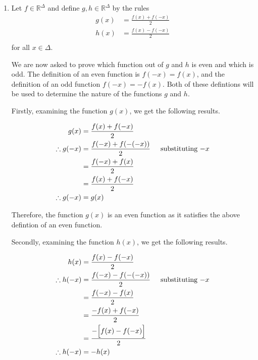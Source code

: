 \documentclass[a4paper]{article}
\begin{document}
\begin{enumerate}[label=\textbf{\arabic*.}]
	\item Let $\displaystyle{f \in \mathbb{R}^{\Delta}}$ and define $\displaystyle{g,h \in \mathbb{R}^{\Delta}}$ by the rules
	\begin{align*}
	g(x) & = \frac{f(x) + f(-x)}{2}\\
	h(x) & = \frac{f(x) - f(-x)}{2}\\
	\end{align*}
	for all $\displaystyle{x \in {\Delta}}$. 

	\bigbreak

	We are now asked to prove which function out of $g$ and $h$ is even and which is odd. The definition of an even function is $\displaystyle{f(-x) = f(x)}$, and the definition of an odd function $\displaystyle{f(-x) = -f(x)}$. Both of these defintions will be used to determine the nature of the functions $g$ and $h$.

	\bigbreak

	Firstly, examining the function $g(x)$, we get the following results.

	\begin{align*}
	g(x) & = \frac{f(x) + f(-x)}{2}\\
	\therefore g(-x) & = \frac{f(-x) + f(-(-x))}{2} \hspace{5mm} \text{substituting $\displaystyle{-x}$}\\
	& = \frac{f(-x) + f(x)}{2}\\
	& = \frac{f(x) + f(-x)}{2}\\
	\therefore g(-x) & = g(x)\\
	\end{align*}

	Therefore, the function $g(x)$ is an even function as it satisfies the above defintion of an even function.

	\bigbreak

	Secondly, examining the function $h(x)$, we get the following results.

	\begin{align*}
	h(x) & = \frac{f(x) - f(-x)}{2}\\
	\therefore h(-x) & = \frac{f(-x) - f(-(-x))}{2} \hspace{5mm} \text{substituting $\displaystyle{-x}$}\\
	& = \frac{f(-x) - f(x)}{2}\\
	& = \frac{-f(x) + f(-x)}{2}\\
	& = \frac{-\Big[f(x) - f(-x)\Big]}{2}\\
	\therefore h(-x) & = -h(x)\\
	\end{align*}


\end{enumerate}
\end{document}
